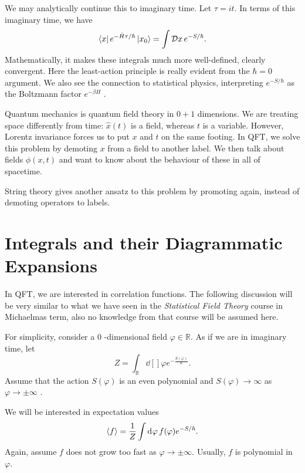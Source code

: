 
We may analytically continue this to imaginary time.
Let $\tau = i t$. In terms of this imaginary time, we have
 \begin{equation}
  \bra{x} e^{- \hat{H} \tau / \hbar} \ket{x_0} = \int \mathop{\mathcal{D} x} e^{-S / \hbar}.
\end{equation}
Mathematically, it makes these integrals much more well-defined, clearly convergent.
Here the least-action principle is really evident from  the $\hbar = 0$ argument.
We also see the connection to statistical physics, interpreting  $e^{-S / \hbar}$  as the Boltzmann factor $e^{-\beta H}$ .

Quantum mechanics is quantum field theory in $0 + 1$  dimensions.
We are treating space differently from time: $\hat{x}(t)$  is a field, whereas $t$  is a variable.
However, Lorentz invariance forces us to put $x$  and $t$  on the same footing.
In QFT, we solve this problem by demoting $x$ from a field to another label. We then talk about fields $\phi(x, t)$ and want to know about the behaviour of these in all of spacetime.
\begin{leftbar}
  String theory gives another ansatz to this problem by promoting again, instead of demoting operators to labels.
\end{leftbar}

\chapter{Integrals and their Diagrammatic Expansions}%
\label{cha:integrals_and_their_diagrammatic_expansions}

In QFT, we are interested in correlation functions.
The following discussion will be very similar to what we have seen in the \emph{Statistical Field Theory} course in Michaelmas term, also no knowledge from that course will be assumed here.

For simplicity, consider a $0$ -dimensional field $\varphi \in \mathbb{R}$. As if we are in imaginary time, let
\begin{equation}
  Z = \int_{\mathbb{R}} \dd[]{\varphi} e^{- \frac{S(\varphi)}{\hbar}}.
\end{equation} 
Assume that the action $S(\varphi)$  is an even polynomial and  $S(\varphi) \to \infty$  as $\varphi \to \pm \infty$ .

We will be interested in expectation values
\begin{equation}
  \expectationvalue{f} = \frac{1}{Z} \int \dd[]{\varphi} f(\varphi) e^{-S / \hbar}.
\end{equation}
Again, assume $f$ does not grow too fast as $\varphi \to \pm \infty$. Usually, $f$ is polynomial in $\varphi$.

